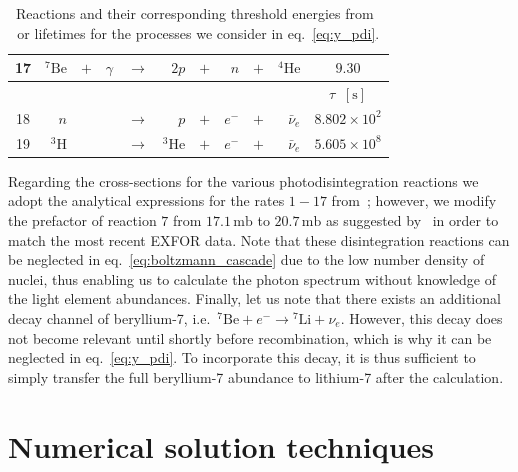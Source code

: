 \documentclass[11pt,a4paper]{article}
\newcommand{\e}{\,}
\begin{document}
\begin{table}
\begin{tabular}{|c|rcrcrcrcr|c|}
		\hline
		17 & $^7\mathrm{Be}$ & $+$ & $\gamma$ & $\rightarrow$ & $2p$ & $+$ &  $n$ & $+$ & $ ^{4}\text{He}$ & $9.30$ \\
		\hline\hline
		 & & & & & & & & & & $\tau\;\;[\mathrm{s}]$\\
		\hline\hline
		18 & $n$ & & & $\rightarrow$ & $p$ & $+$ & $e^-$ & $+$ & $\bar{\nu}_e$ & $8.802\times10^2$\\
		\hline
		19 & $^3\text{H}$ & & & $\rightarrow$ & $^3\text{He}$ & $+$ & $e^-$ & $+$ & $\bar{\nu}_e$ & $5.605 \times 10^8$ \\
		\hline
	\end{tabular}
\caption{Reactions and their corresponding threshold energies from~\cite{Cyburt:2002uv} or lifetimes for the processes we consider in eq.~\eqref{eq:y_pdi}.}
\label{tab:reactions}
\end{table}
Regarding the cross-sections for the various photodisintegration reactions we adopt the analytical expressions for the rates $1-17$ from~\cite{Cyburt:2002uv}; however, we modify the prefactor of reaction $7$ from $17.1\e\mathrm{mb}$ to $20.7\e\mathrm{mb}$ as suggested by~\cite{Jedamzik:2006xz} in order to match the most recent EXFOR data. Note that these disintegration reactions can be neglected in eq.~\eqref{eq:boltzmann_cascade} due to the low number density of nuclei, thus enabling us to calculate the photon spectrum without knowledge of the light element abundances. Finally, let us note that there exists an additional decay channel of beryllium-7, i.e.\ ${}^7\text{Be} + e^- \rightarrow {}^7\text{Li} +\nu_e$. However, this decay does not become relevant until shortly before recombination, which is why it can be neglected in eq.~\eqref{eq:y_pdi}. To incorporate this decay, it is thus sufficient to simply transfer the full beryllium-7 abundance to lithium-7 after the calculation.

\section{Numerical solution techniques}
\end{document}
